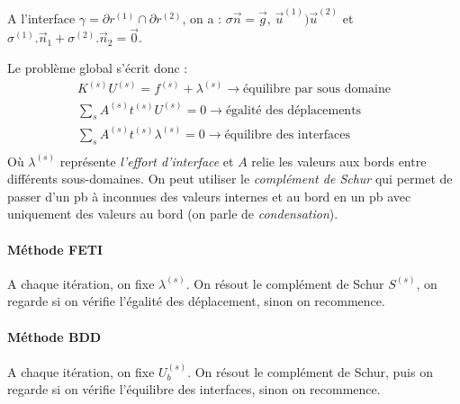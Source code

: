\documentclass{article}
\begin{document}
A l'interface $\gamma = \partial r^{(1)} \cap \partial r^{(2)}$, on a : $\sigma \vec{n} = \vec{g}$, $\vec{u}^{(1)})\vec{u}^{(2)}$ et $\sigma^{(1)}.\vec{n}_1 + \sigma^{(2)}.\vec{n}_2 = \vec{0}$.

Le problème global s'écrit donc :
\begin{align*}
K^{(s)}U^{(s)} = f^{(s)} + \lambda^{(s)} \to \text{équilibre par sous domaine}\\
\sum_s A^{(s)} t^{(s)} U^{(s)} = 0 \to \text{égalité des déplacements}\\
\sum_s A^{(s)}t^{(s)}\lambda^{(s)} = 0 \to \text{équilibre des interfaces}\\
\end{align*}
Où $\lambda^{(s)}$ représente \emph{l'effort d'interface} et $A$ relie les valeurs aux bords entre différents sous-domaines. On peut utiliser le \emph{complément de Schur} qui permet de passer d'un pb à inconnues des valeurs internes et au bord en un pb avec uniquement des valeurs au bord (on parle de \emph{condensation}).

\paragraph{Méthode FETI}
A chaque itération, on fixe $\lambda^{(s)}$. On résout le complément de Schur $S^{(s)}$, on regarde si on vérifie l'égalité des déplacement, sinon on recommence.

\paragraph{Méthode BDD}
A chaque itération, on fixe $U_b^{(s)}$. On résout le complément de Schur, puis on regarde si on vérifie l'équilibre des interfaces, sinon on recommence.
\end{document}
